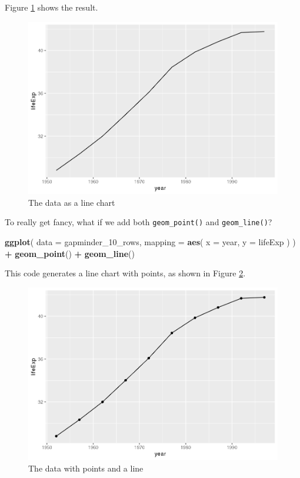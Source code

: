 \documentclass[
]{book}
\newenvironment{Shaded}{\begin{snugshade}}{\end{snugshade}}
\newcommand{\AttributeTok}[1]{\textcolor[rgb]{0.13,0.29,0.53}{#1}}
\newcommand{\FunctionTok}[1]{\textcolor[rgb]{0.13,0.29,0.53}{\textbf{#1}}}
\newcommand{\NormalTok}[1]{#1}
\newcommand{\SpecialCharTok}[1]{\textcolor[rgb]{0.81,0.36,0.00}{\textbf{#1}}}
\begin{document}
Figure \ref{fig:gapminder-line-plot} shows the result.

\begin{figure}
\includegraphics[width=1\linewidth]{data-viz_files/figure-latex/gapminder-line-plot-1} \caption{The data as a line chart}\label{fig:gapminder-line-plot}
\end{figure}

To really get fancy, what if we add both \texttt{geom\_point()} and \texttt{geom\_line()}?

\begin{Shaded}
\begin{Highlighting}[]
\FunctionTok{ggplot}\NormalTok{(}
  \AttributeTok{data =}\NormalTok{ gapminder\_10\_rows,}
  \AttributeTok{mapping =} \FunctionTok{aes}\NormalTok{(}
    \AttributeTok{x =}\NormalTok{ year,}
    \AttributeTok{y =}\NormalTok{ lifeExp}
\NormalTok{  )}
\NormalTok{) }\SpecialCharTok{+}
  \FunctionTok{geom\_point}\NormalTok{() }\SpecialCharTok{+}
  \FunctionTok{geom\_line}\NormalTok{()}
\end{Highlighting}
\end{Shaded}

This code generates a line chart with points, as shown in Figure \ref{fig:gapminder-points-line-plot}.

\begin{figure}
\includegraphics[width=1\linewidth]{data-viz_files/figure-latex/gapminder-points-line-plot-1} \caption{The data with points and a line}\label{fig:gapminder-points-line-plot}
\end{figure}
\end{document}
